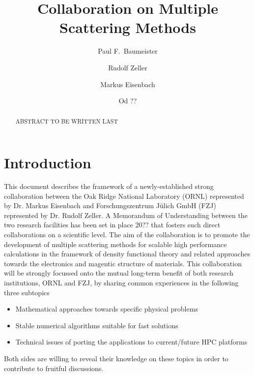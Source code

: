 \documentclass{llncs}
\begin{document}
\title{Collaboration on Multiple Scattering Methods}

\author{ 
  Paul F.~Baumeister 
  \and
  Rudolf Zeller
  \and
  Markus Eisenbach
  \and
  Od ??
}


\maketitle
\thispagestyle{firstpage}

\begin{abstract}
  ABSTRACT TO BE WRITTEN LAST
\end{abstract}

\section{Introduction} \label{section:intro}
This document describes the framework of a newly-established strong collaboration
between the Oak Ridge National Laboratory (ORNL) represented by Dr. Markus Eisenbach
and Forschungszentrum J\"ulich GmbH (FZJ) represented by Dr. Rudolf Zeller.
A Memorandum of Understanding between the two research facilities has been set in place 20?? 
that fosters such direct collaborations on a scientific level.
The aim of the collaboration is to promote the development of multiple scattering methods
for scalable high performance calculations in the framework of density functional theory
and related approaches towards the electronics and magentic structure of materials.
This collaboration will be strongly focussed onto the mutual long-term benefit of both research institutions, 
ORNL and FZJ, by sharing common experiences in the following three subtopics
\begin{itemize}
 \item Mathematical approaches towards specific physical problems  
 \item Stable numerical algorithms suitable for fast solutions
 \item Technical issues of porting the applications to current/future HPC platforms
\end{itemize}
Both sides are willing to reveal their knowledge on these topics in order to
contribute to fruitful discussions.
\end{document}
